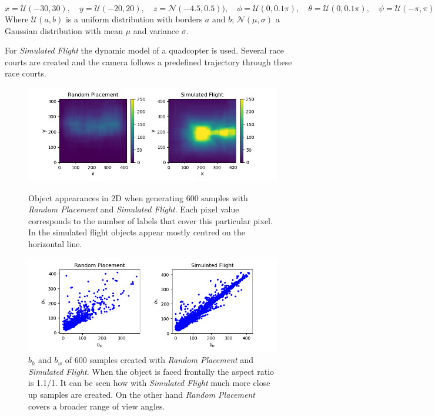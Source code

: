 \begin{equation}
x = \mathcal{U}(-30,30),\quad y = \mathcal{U}(-20,20),\quad z = \mathcal{N}(-4.5,0.5)),\quad
\phi = \mathcal{U}(0,0.1\pi),\quad \theta = \mathcal{U}(0,0.1\pi),\quad \psi = \mathcal{U}(-\pi,\pi)
\label{eq:distroexp}
\end{equation}
Where $\mathcal{U}(a,b)$ is a uniform distribution with borders $a$ and $b$; $\mathcal{N}(\mu,\sigma)$ a Gaussian distribution with mean $\mu$ and variance $\sigma$. 

For \textit{Simulated Flight} the dynamic model of a quadcopter is used. Several race courts are created and the camera follows a predefined trajectory through these race courts.

\begin{figure}
	\begin{minipage}{\textwidth}
		\includegraphics[width=\textwidth]{fig/heatmap_camplace}
		\caption{Object appearances in 2D when generating 600 samples with \textit{Random Placement} and  \textit{Simulated Flight}. Each pixel value corresponds to the number of labels that cover this particular pixel. In the simulated flight objects appear mostly centred on the horizontal line.}
		\label{fig:heatmap_camplace}
	\end{minipage}
	\begin{minipage}{\textwidth}
	\includegraphics[width=\textwidth]{fig/ar_train}
	\caption{$b_h$ and $b_w$ of 600 samples created with \textit{Random Placement} and  \textit{Simulated Flight}. When the object is faced frontally the aspect ratio is 1.1/1. It can be seen how with \textit{Simulated Flight} much more close up samples are created. On the other hand \textit{Random Placement} covers a broader range of view angles.}
	\label{fig:aspect_ratio_camplace}
	\end{minipage}
\end{figure}

